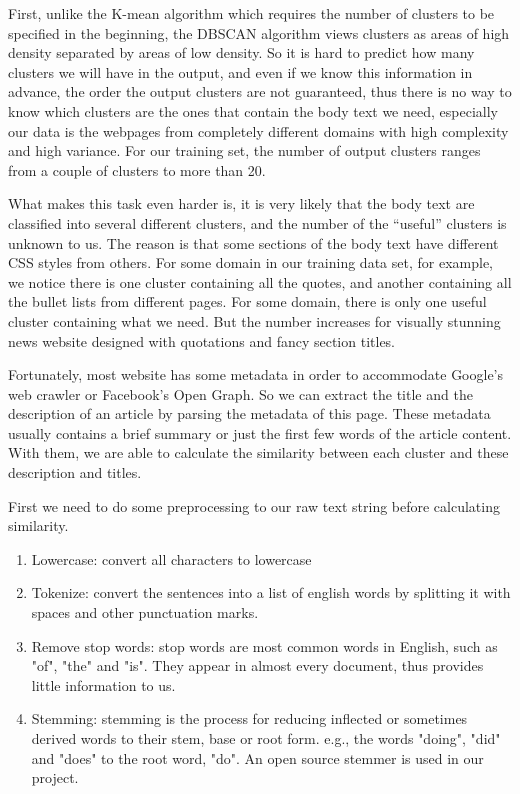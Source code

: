 \documentclass{acm_proc_article-sp}
\begin{document}
First, unlike the K-mean algorithm which requires the number of clusters to be specified in the beginning, the DBSCAN algorithm views clusters as areas of high density separated by areas of low density. So it is hard to predict how many clusters we will have in the output, and even if we know this information in advance, the order the output clusters are not guaranteed, thus there is no way to know which clusters are the ones that contain the body text we need, especially our data is the webpages from completely different domains with high complexity and high variance. For our training set, the number of output clusters ranges from a couple of clusters to more than 20.

What makes this task even harder is, it is very likely that the body text are classified into several different clusters, and the number of the ``useful'' clusters is unknown to us. The reason is that some sections of the body text have different CSS styles from others. For some domain in our training data set, for example, we notice there is one cluster containing all the quotes, and another containing all the bullet lists from different pages. For some domain, there is only one useful cluster containing what we need. But the number increases for visually stunning news website designed with quotations and fancy section titles.

Fortunately, most website has some metadata in order to accommodate Google's web crawler or Facebook's Open Graph. So we can extract the title and the description of an article by parsing the metadata of this page. These metadata usually contains a brief summary or just the first few words of the article content. With them, we are able to calculate the similarity between each cluster and these description and titles.

First we need to do some preprocessing to our raw text string before calculating similarity.

\makeatletter
\renewcommand{\theenumi}{\roman{enumi}}
\makeatother
\begin{enumerate}
\item Lowercase: convert all characters to lowercase
\item Tokenize: convert the sentences into a list of english words by splitting it with spaces and other punctuation marks.
\item Remove stop words: stop words are most common words in English, such as "of", "the" and "is". They appear in almost every document, thus provides little information to us.
\item Stemming: stemming is the process for reducing inflected or sometimes derived words to their stem, base or root form. e.g., the words "doing", "did" and "does" to the root word, "do". An open source stemmer is used in our project.
\end{enumerate}
\end{document}

